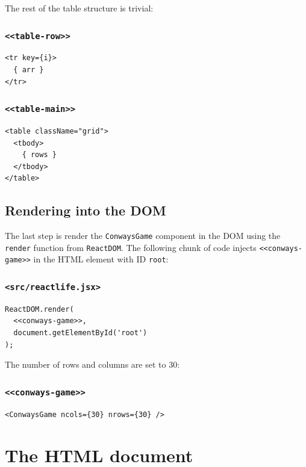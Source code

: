 \documentclass[11pt]{article}
\begin{document}
The rest of the table structure is trivial:

\subsubsection{\texttt{<<table-row>>}}
\label{sec:org2524783}
\begin{verbatim}
<tr key={i}>
  { arr }
</tr>
\end{verbatim}

\subsubsection{\texttt{<<table-main>>}}
\label{sec:org1694974}
\begin{verbatim}
<table className="grid">
  <tbody>
    { rows }
  </tbody>
</table>
\end{verbatim}

\subsection{Rendering into the DOM}
\label{sec:org802715f}

The last step is render the \texttt{ConwaysGame} component in the DOM using the \texttt{render} function from \texttt{ReactDOM}. The following chunk of code injects \texttt{<<conways-game>>} in the HTML element with ID \texttt{root}:

\subsubsection{\texttt{<src/reactlife.jsx>}}
\label{sec:org16fddb8}
\begin{verbatim}
ReactDOM.render(
  <<conways-game>>,
  document.getElementById('root')
);
\end{verbatim}

The number of rows and columns are set to 30:

\subsubsection{\texttt{<<conways-game>>}}
\label{sec:orgf763a13}
\begin{verbatim}
<ConwaysGame ncols={30} nrows={30} />
\end{verbatim}

\section{The HTML document}
\label{sec:org1abc3cd}
\end{document}
